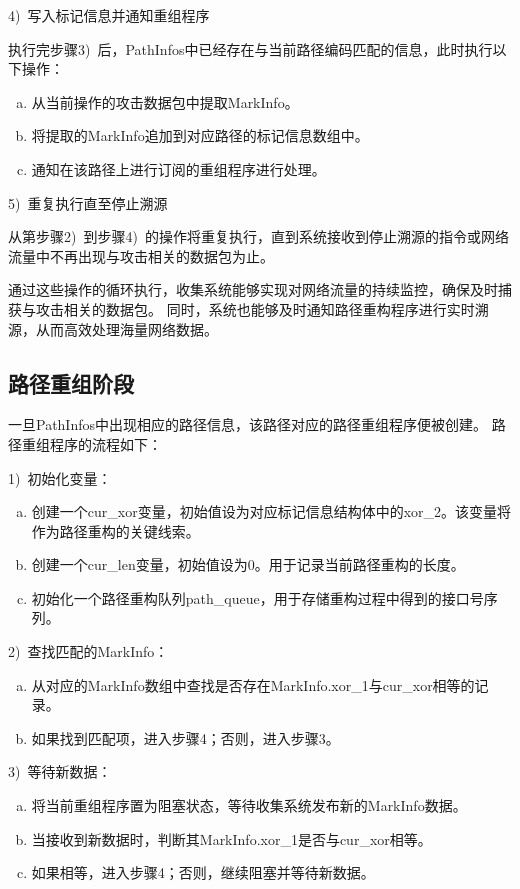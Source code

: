 4)~写入标记信息并通知重组程序\par
执行完步骤3)~后，PathInfos中已经存在与当前路径编码匹配的信息，此时执行以下操作：
\begin{enumerate}[a.]
	\item 从当前操作的攻击数据包中提取MarkInfo。
	\item 将提取的MarkInfo追加到对应路径的标记信息数组中。
	\item 通知在该路径上进行订阅的重组程序进行处理。
\end{enumerate}
\par
5)~重复执行直至停止溯源\par
从第步骤2)~到步骤4)~的操作将重复执行，直到系统接收到停止溯源的指令或网络流量中不再出现与攻击相关的数据包为止。\par

通过这些操作的循环执行，收集系统能够实现对网络流量的持续监控，确保及时捕获与攻击相关的数据包。
同时，系统也能够及时通知路径重构程序进行实时溯源，从而高效处理海量网络数据。

\subsection{路径重组阶段}
一旦PathInfos中出现相应的路径信息，该路径对应的路径重组程序便被创建。
路径重组程序的流程如下：\par
1)~初始化变量：\par
\begin{enumerate}[a.]
	\item 创建一个cur\_xor变量，初始值设为对应标记信息结构体中的xor\_2。该变量将作为路径重构的关键线索。
	\item 创建一个cur\_len变量，初始值设为0。用于记录当前路径重构的长度。
	\item 初始化一个路径重构队列path\_queue，用于存储重构过程中得到的接口号序列。
\end{enumerate}

2)~查找匹配的MarkInfo：\par
\begin{enumerate}[a.]
	\item 从对应的MarkInfo数组中查找是否存在MarkInfo.xor\_1与cur\_xor相等的记录。
	\item 如果找到匹配项，进入步骤4；否则，进入步骤3。
\end{enumerate}

3)~等待新数据：\par
\begin{enumerate}[a.]
	\item 将当前重组程序置为阻塞状态，等待收集系统发布新的MarkInfo数据。
	\item 当接收到新数据时，判断其MarkInfo.xor\_1是否与cur\_xor相等。
	\item 如果相等，进入步骤4；否则，继续阻塞并等待新数据。
\end{enumerate}

